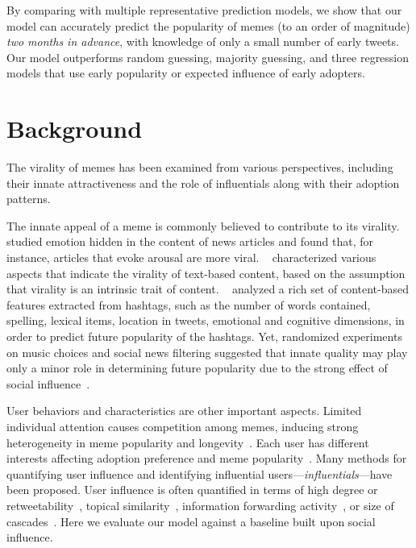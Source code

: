 \documentclass[letterpaper]{article}
\begin{document}
By comparing with multiple representative prediction models, we show that our model can accurately predict the popularity of memes (to an order of magnitude) \emph{two months in advance}, with knowledge of only a small number of early tweets. Our model outperforms random guessing, majority guessing, and three regression models that use early popularity or expected influence of early adopters.


\section{Background}


The virality of memes has been examined from various perspectives, including their innate attractiveness and the role of influentials along with their adoption patterns.


The innate appeal of a meme is commonly believed to contribute to its virality. \citeauthor{Berger:2009viral}~ studied emotion hidden in the content of news articles and found that, for instance, articles that evoke arousal are more viral. \citeauthor{Guerini2011text}~ characterized various aspects that indicate the virality of text-based content, based on the assumption that virality is an intrinsic trait of content.
\citeauthor{tsur2012wsdm}~ analyzed a rich set of content-based features extracted from hashtags, such as the number of words contained, spelling, lexical items, location in tweets, emotional and cognitive dimensions, in order to predict future popularity of the hashtags.
Yet, randomized experiments on music choices and social news filtering suggested that innate quality may play only a minor role in
determining future popularity due to the strong effect of social influence~\cite{Salganik2006music,muchnik2013}.


User behaviors and characteristics are other important aspects. Limited individual attention causes competition
among memes, inducing strong heterogeneity in meme popularity and
longevity~\cite{Weng:2012scirep}. Each user has different interests affecting
adoption preference and meme popularity~\cite{Mei2012tags}.
Many methods for quantifying user influence and identifying influential users---\emph{influentials}---have been proposed. User influence is often quantified in terms of high degree or retweetability~\cite{cha2010measuring,Suh2010}, topical
similarity~\cite{tang2009social,weng2010twitterrank}, information forwarding
activity~\cite{romero2011influence,Suh2010}, or size of cascades~\cite{Kitsak2010kcore,bakshy_everyones_2011}. Here we evaluate our model against a baseline built upon social influence.
\end{document}
